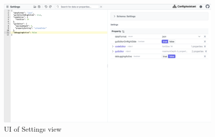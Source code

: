 \begin{figure}[!htb]
    \includegraphics[width=\textwidth]{figures/settings}
    \caption{UI of Settings view}
    \label{fig:settings}
\end{figure}





